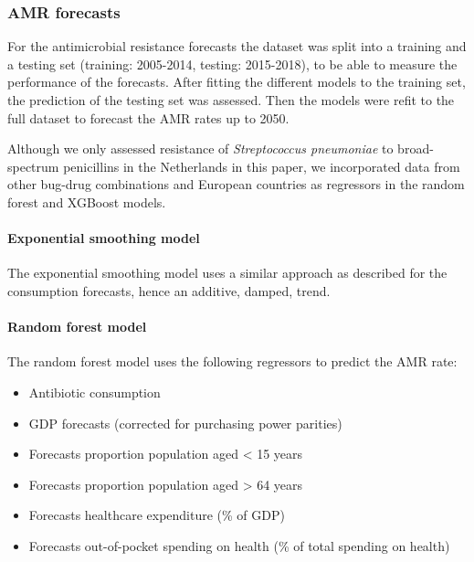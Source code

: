 \documentclass[
]{article}
\begin{document}
\hypertarget{amr-forecasts}{%
\subsubsection{AMR forecasts}\label{amr-forecasts}}

For the antimicrobial resistance forecasts the dataset was split into a training and a testing set (training: 2005-2014, testing: 2015-2018), to be able to measure the performance of the forecasts. After fitting the different models to the training set, the prediction of the testing set was assessed. Then the models were refit to the full dataset to forecast the AMR rates up to 2050.

Although we only assessed resistance of \emph{Streptococcus pneumoniae} to broad-spectrum penicillins in the Netherlands in this paper, we incorporated data from other bug-drug combinations and European countries as regressors in the random forest and XGBoost models.

\hypertarget{exponential-smoothing-model}{%
\paragraph{Exponential smoothing model}\label{exponential-smoothing-model}}

The exponential smoothing model uses a similar approach as described for the consumption forecasts, hence an additive, damped, trend.

\hypertarget{random-forest-model}{%
\paragraph{Random forest model}\label{random-forest-model}}

The random forest model uses the following regressors to predict the AMR rate:

\begin{itemize}
\item
  Antibiotic consumption
\item
  GDP forecasts (corrected for purchasing power parities)
\item
  Forecasts proportion population aged \textless{} 15 years
\item
  Forecasts proportion population aged \textgreater{} 64 years
\item
  Forecasts healthcare expenditure (\% of GDP)
\item
  Forecasts out-of-pocket spending on health (\% of total spending on health)
\end{itemize}
\end{document}
